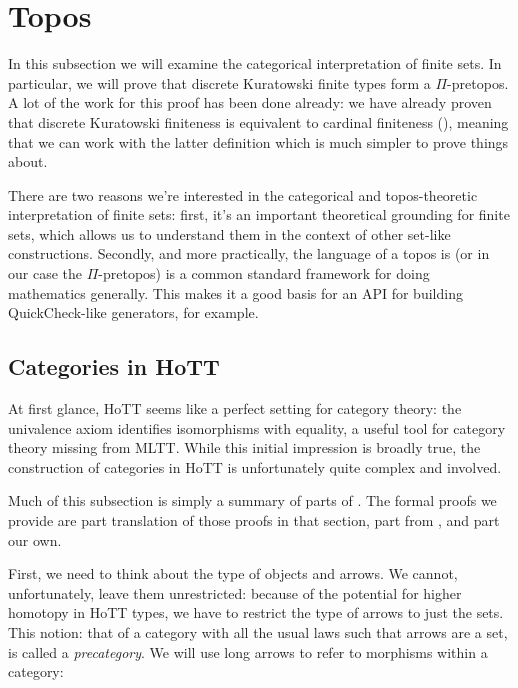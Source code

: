 \section{Topos}\label{topos}
In this subsection we will examine the categorical interpretation of finite sets.
In particular, we will prove that discrete Kuratowski finite types form a
\(\Pi\)-pretopos.
A lot of the work for this proof has been done already: we have already proven
that discrete Kuratowski finiteness is equivalent to cardinal finiteness
(), meaning that we can work with the latter
definition which is much simpler to prove things about.

There are two reasons we're interested in the categorical and topos-theoretic
interpretation of finite sets: first, it's an important theoretical grounding
for finite sets, which allows us to understand them in the context of other
set-like constructions.
Secondly, and more practically, the language of a topos is (or in our case the
\(\Pi\)-pretopos) is a common standard framework for doing mathematics
generally.
This makes it a good basis for an API for building QuickCheck-like generators,
for example.
\subsection{Categories in HoTT}
At first glance, HoTT seems like a perfect setting for category theory: the
univalence axiom identifies isomorphisms with equality, a useful tool for
category theory missing from MLTT.
While this initial impression is broadly true, the construction of categories in
HoTT is unfortunately quite complex and involved.

Much of this subsection is simply a summary of parts of \citet[section
9]{hottbook}.
The formal proofs we provide are part translation of those proofs in that
section, part from \citep{iversenFredefoxCat2018}
\citep{huProofrelevantCategoryTheory2020}, and part our own.

First, we need to think about the type of objects and arrows.
We cannot, unfortunately, leave them unrestricted: because of the potential for
higher homotopy in HoTT types, we have
to restrict the type of arrows to just the sets.
This notion: that of a category with all the usual laws such that arrows are a
set, is called a \emph{precategory}.
We will use long arrows to refer to morphisms within a category:

